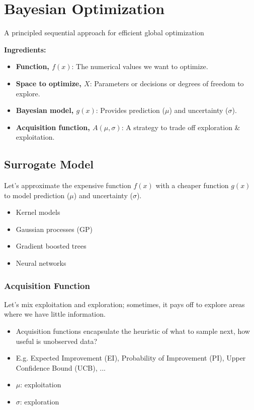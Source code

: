 \section{Bayesian Optimization}
\begin{definition}
    A principled sequential approach for efficient global optimization
    \vspace{1em}

    \textbf{Ingredients:}
    \begin{itemize}
        \item \textbf{Function, $f(x)$}: The numerical values we want to optimize.
        \item \textbf{Space to optimize, $X$}: Parameters or decisions or degrees of freedom to explore.
        \item \textbf{Bayesian model, $g(x)$}: Provides prediction ($\mu$) and uncertainty ($\sigma$).
        \item \textbf{Acquisition function, $A(\mu, \sigma)$}: A strategy to trade off exploration \& exploitation.
    \end{itemize}
\end{definition}

\subsection{Surrogate Model}
\begin{notes}
    Let's approximate the expensive function $f(x)$ with a cheaper function $g(x)$ to model prediction ($\mu$) and uncertainty ($\sigma$).
    \begin{itemize}
        \item Kernel models
        \item Gaussian processes (GP)
        \item Gradient boosted trees
        \item Neural networks
    \end{itemize}
\end{notes}

\subsubsection{Acquisition Function}
\begin{notes}
    Let's mix exploitation and exploration; sometimes, it pays off to explore areas where we have little information.
    \begin{itemize}
        \item Acquisition functions encapsulate the heuristic of what to sample next, how useful is unobserved data?
        \item E.g. Expected Improvement (EI), Probability of Improvement (PI), Upper Confidence Bound (UCB), ...
        \item $\mu$: exploitation 
        \item $\sigma$: exploration 
    \end{itemize}
\end{notes}

